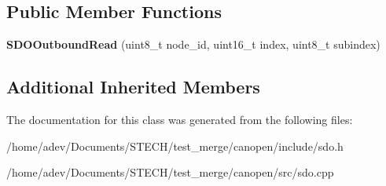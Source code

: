 \subsection*{Public Member Functions}
\begin{DoxyCompactItemize}
\item 
\mbox{\label{class_c_a_nopen_1_1_s_d_o_outbound_read_a622eb7aa4300ebdcd74d7e50e5a7b6e3}} 
{\bfseries S\+D\+O\+Outbound\+Read} (uint8\+\_\+t node\+\_\+id, uint16\+\_\+t index, uint8\+\_\+t subindex)
\end{DoxyCompactItemize}
\subsection*{Additional Inherited Members}


The documentation for this class was generated from the following files\+:\begin{DoxyCompactItemize}
\item 
/home/adev/\+Documents/\+S\+T\+E\+C\+H/test\+\_\+merge/canopen/include/sdo.\+h\item 
/home/adev/\+Documents/\+S\+T\+E\+C\+H/test\+\_\+merge/canopen/src/sdo.\+cpp\end{DoxyCompactItemize}
